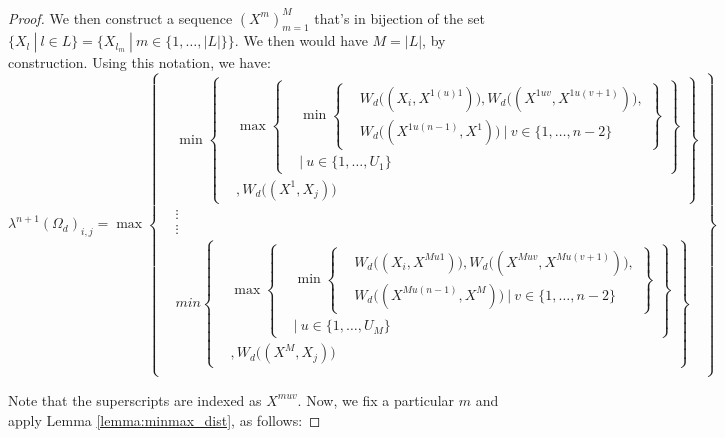 \documentclass{article} %
\theoremstyle{style1}
\theoremstyle{style1}
\theoremstyle{example}
\begin{document}
\begin{proof}
We then construct a sequence $(X^m)_{m=1}^M$ that's in bijection of the set $\{X_l\ |\ l\in L\}=\big\{X_{l_m}\ |\ m\in\{1,\ldots,|L|\}\big\}$. We then would have $M=|L|$, by construction. Using this notation, we have:
\[
\lambda^{n+1}(\Omega_d)_{i,j} =\max
\left\{
  \begin{aligned}
    &\min
      \left\{
      \begin{aligned}
        &\max
          \left\{
          \begin{aligned}
            &\min\left\{
            \begin{aligned}
            &W_d\big((X_i,X^{1(u)1})\big), W_d\big((X^{1uv},X^{1u(v+1)})\big), \\
            &W_d\big((X^{1u(n-1)},X^1)\big)\ |\ v\in\{1,\ldots,n-2\}
            \end{aligned}
            \right\} \\
            &|\ u\in\{1,\ldots,U_1\}
          \end{aligned}
          \right\} \\
          &, W_d\big((X^1,X_j)\big)
      \end{aligned}
      \right\} \\
      &\vdots \\
      &\vdots \\
    &min
      \left\{
      \begin{aligned}
        &\max
          \left\{
          \begin{aligned}
            &\min\left\{
            \begin{aligned}
            &W_d\big((X_i,X^{Mu1})\big), W_d\big((X^{Muv},X^{Mu(v+1)})\big), \\
            &W_d\big((X^{Mu(n-1)},X^M)\big)\ |\ v\in\{1,\ldots,n-2\}
            \end{aligned}
            \right\} \\
            &|\ u\in\{1,\ldots,U_M\}
          \end{aligned}
          \right\} \\
          &, W_d\big((X^M,X_j)\big)
      \end{aligned}
      \right\} \\
  \end{aligned}
\right\}
\]

Note that the superscripts are indexed as $X^{muv}$. Now, we fix a particular $m$ and apply Lemma \ref{lemma:minmax_dist}, as follows:


\end{proof}
\end{document}
